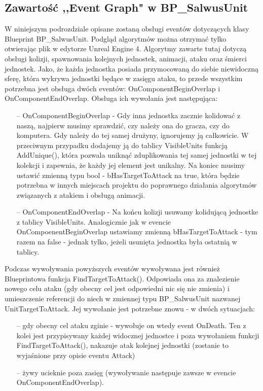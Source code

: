 \documentclass[12pt]{report}
\begin{document}
\subsection{Zawartość ,,Event Graph" w BP\_SalwusUnit}
W niniejszym podrozdziale opisane zostaną obsługi eventów dotyczących klasy Blueprint BP\_SalwusUnit. Podgląd algorytmów można otrzymać tylko otwierając plik w edytorze Unreal Engine 4. Algorytmy zawarte tutaj dotyczą obsługi kolizji, spawnowania kolejnych jednostek, animacji, ataku oraz śmierci jednostek. Jako, że każda jednostka posiada przymocowaną do siebie niewidoczną sferę, która wykrywa jednostki będące w zasięgu ataku, to przede wszystkim potrzebna jest obsługa dwóch eventów: OnComponentBeginOverlap i OnComponentEndOverlap. Obsługa ich wywołania jest następująca:
\begin{itemize}
\item[--] OnComponentBeginOverlap - Gdy inna jednostka zacznie kolidować z naszą, najpierw musimy sprawdzić, czy należy ona do gracza, czy do komputera. Gdy należy do tej samej drużyny, ignorujemy ją całkowicie. W przeciwnym przypadku dodajemy ją do tablicy VisibleUnits funkcją AddUnique(), która pozwala uniknąć zduplikowania tej samej jednostki w tej kolekcji i zapewnia, że każdy jej element jest unikalny. Na koniec musimy ustawić zmienną typu bool - bHasTargetToAttack na true, która będzie potrzebna w innych miejscach projektu do poprawnego działania algorytmów związanych z atakiem i obsługą animacji.
\item[--] OnComponentEndOverlap - Na końcu kolizji usuwamy kolidującą jednostke z tablicy VisibleUnits. Analogicznie jak w evencie OnCompoenentBeginOverlap ustawiamy zmienną bHasTargetToAttack - tym razem na false - jednak tylko, jeżeli usunięta jednostka była ostatnią w tablicy.
\end{itemize}

Podczas wywoływania powyższych eventów wywoływana jest również Blueprintowa funkcja FindTargetToAttack(). Odpowiada ona za znalezienie nowego celu ataku (gdy obecny cel jest odpowiedni nic się nie zmienia) i umieszczenie referencji do niech w zmiennej typu BP\_SalwusUnit nazwanej UnitTargetToAttack. Jej wywołanie jest potrzebne znowu - w dwóch sytuacjach:
\begin{itemize}
\item[--] gdy obecny cel ataku zginie - wywołuje on wtedy event OnDeath. Ten z kolei jest przypisywany każdej widocznej jednostce i poza wywołaniem funkcji FindTargetToAttack(), nakazuje atak kolejnej jednostki (zostanie to wyjaśnione przy opisie eventu Attack)
\item[--] żywy ucieknie poza zasięg (wywoływanie następuje zawsze w evencie OnComponentEndOverlap).
\end{itemize}
\end{document}
